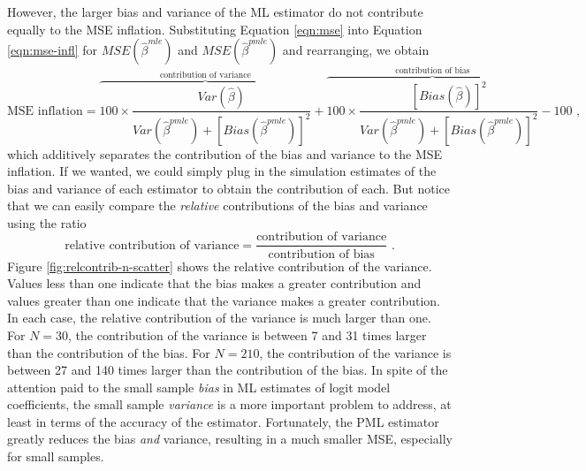 \documentclass[12pt]{article}
\begin{document}
However, the larger bias and variance of the ML estimator do not contribute equally to the MSE inflation.
Substituting Equation \ref{eqn:mse} into Equation \ref{eqn:mse-infl} for $MSE(\hat{\beta}^{mle})$ and $MSE(\hat{\beta}^{pmle})$ and rearranging, we obtain
\begin{equation}
\text{MSE inflation} = \overbrace{100 \times \dfrac{Var(\hat{\beta})}{Var(\hat{\beta}^{pmle}) + [Bias(\hat{\beta}^{pmle})]^2}}^{\text{contribution of variance}} + \overbrace{100 \times \dfrac{[Bias(\hat{\beta})]^2}{Var(\hat{\beta}^{pmle}) + [Bias(\hat{\beta}^{pmle})]^2}}^{\text{contribution of bias}}  - 100 \text{ ,} \nonumber
\end{equation}
\noindent which additively separates the contribution of the bias and variance to the MSE inflation.
If we wanted, we could simply plug in the simulation estimates of the bias and variance of each estimator to obtain the contribution of each.
But notice that we can easily compare the \textit{relative} contributions of the bias and variance using the ratio
\begin{equation}\label{eqn:rel-contrib}
\text{relative contribution of variance} = \dfrac{\text{contribution of variance}}{\text{contribution of bias}} \text{ .}
\end{equation}
\noindent Figure \ref{fig:relcontrib-n-scatter} shows the relative contribution of the variance.
Values less than one indicate that the bias makes a greater contribution and values greater than one indicate that the variance makes a greater contribution.
In each case, the relative contribution of the variance is much larger than one.
For $N = 30$, the contribution of the variance is between 7 and 31 times larger than the contribution of the bias.
For $N = 210$, the contribution of the variance is between 27 and 140 times larger than the contribution of the bias.
In spite of the attention paid to the small sample \textit{bias} in ML estimates of logit model coefficients, the small sample \textit{variance} is a more important problem to address, at least in terms of the accuracy of the estimator.
Fortunately, the PML estimator greatly reduces the bias \textit{and} variance, resulting in a much smaller MSE, especially for small samples.
\end{document}
